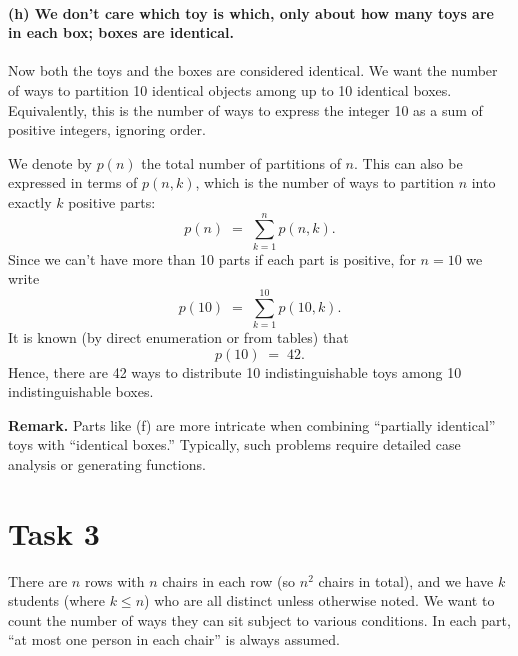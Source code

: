 \documentclass[docmute]{article}
\begin{document}
\paragraph{(h) We don’t care which toy is which, only about how many toys are in each box; boxes are identical.}
Now both the toys and the boxes are considered identical. We want the number of ways to partition 10 identical objects among up to 10 identical boxes. Equivalently, this is the number of ways to express the integer 10 as a sum of positive integers, ignoring order. 

We denote by \(p(n)\) the total number of partitions of \(n\). This can also be expressed in terms of \(p(n,k)\), which is the number of ways to partition \(n\) into exactly \(k\) positive parts:
\[
p(n) \;=\; \sum_{k=1}^{n} p(n,k).
\]
Since we can’t have more than 10 parts if each part is positive, for \(n=10\) we write
\[
p(10) 
\;=\;
\sum_{k=1}^{10} p(10,k).
\]
It is known (by direct enumeration or from tables) that
\[
p(10) \;=\; 42.
\]
Hence, there are 42 ways to distribute 10 indistinguishable toys among 10 indistinguishable boxes.

\bigskip
\noindent
\textbf{Remark.} Parts like (f) are more intricate when combining “partially identical” toys with “identical boxes.” Typically, such problems require detailed case analysis or generating functions.

\section*{Task 3}

There are \(n\) rows with \(n\) chairs in each row (so \(n^2\) chairs in total), and we have \(k\) students (where \(k \le n\)) who are all distinct unless otherwise noted. We want to count the number of ways they can sit subject to various conditions. In each part, “at most one person in each chair” is always assumed.
\end{document}
